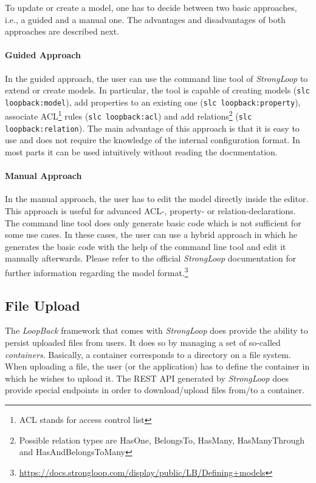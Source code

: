 \documentclass[nochapterpage,nopartpage,noheadingspace,numbersubsubsec,bigchapter,colorback,accentcolor=tud9c,10pt]{tudreport}
\begin{document}
    To update or create a model, one has to decide between two basic approaches, i.e., a guided and a manual one. The advantages and disadvantages of both approaches are described next.

  \paragraph{Guided Approach}
    In the guided approach, the user can use the command line tool of \emph{StrongLoop} to extend or create models. In particular, the tool is capable of creating models (\texttt{slc loopback:model}), add properties to an existing one (\texttt{slc loopback:property}), associate ACL\footnote{ACL stands for access control list} rules (\texttt{slc loopback:acl}) and add relations\footnote{Possible relation types are HasOne, BelongsTo, HasMany, HasManyThrough and HasAndBelongsToMany} (\texttt{slc loopback:relation}). The main advantage of this approach is that it is easy to use and does not require the knowledge of the internal configuration format. In most parts it can be used intuitively without reading the documentation.

  \paragraph{Manual Approach}
    In the manual approach, the user has to edit the model directly inside the editor. This approach is useful for advanced ACL-, property- or relation-declarations. The command line tool does only generate basic code which is not sufficient for some use cases. In these cases, the user can use a hybrid approach in which he generates the basic code with the help of the command line tool and edit it manually afterwards. Please refer to the official \emph{StrongLoop} documentation for further information regarding the model format.\footnote{\url{https://docs.strongloop.com/display/public/LB/Defining+models}}

  \subsection{File Upload}
  \label{sec:tech:implementation:strongloop:container}

    The \emph{LoopBack} framework that comes with \emph{StrongLoop} does provide the ability to persist uploaded files from users. It does so by managing a set of so-called \emph{containers}. Basically, a container corresponds to a directory on a file system. When uploading a file, the user (or the application) has to define the container in which he wishes to upload it. The REST API generated by \emph{StrongLoop} does provide special endpoints in order to download/upload files from/to a container.
\end{document}
